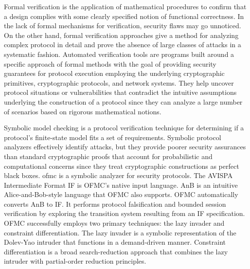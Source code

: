 Formal verification is the application of mathematical procedures to confirm that a design complies with some clearly specified notion of functional correctness. In the lack of formal mechanisms for verification, security flaws may go unnoticed. On the other hand, formal verification approaches give a method for analyzing complex protocol in detail and prove the absence of large classes of attacks in a systematic fashion. Automated verification tools are programs built around a specific approach of formal methods with the goal of providing security guarantees for protocol execution employing the underlying cryptographic primitives, cryptographic protocols, and network systems. They help uncover protocol situations or vulnerabilities that contradict the intuitive assumptions underlying the construction of a protocol since they can analyze a large number of scenarios based on rigorous mathematical notions.
\par
Symbolic model checking is a protocol verification technique for determining if a protocol's finite-state model fits a set of requirements. Symbolic protocol analyzers effectively identify attacks, but they provide poorer security assurances than standard cryptographic proofs that account for probabilistic and computational concerns since they treat cryptographic constructions as perfect black boxes. \gls{ofmc} \cite{ofmc}  is a symbolic analyzer for security protocols. The AVISPA Intermediate Format IF \cite{avispa} is OFMC's native input language. AnB \cite{AnB} is an intuitive Alice-and-Bob-style language that OFMC also supports. OFMC automatically converts AnB to IF. It performs protocol falsification and bounded session verification by exploring the transition system resulting from an IF specification. OFMC successfully employs two primary techniques: the lazy invader and constraint differentiation. The lazy invader is a symbolic representation of the Dolev-Yao intruder \cite{dolev1983security} that functions in a demand-driven manner. Constraint differentiation is a broad search-reduction approach that combines the lazy intruder with partial-order reduction principles.